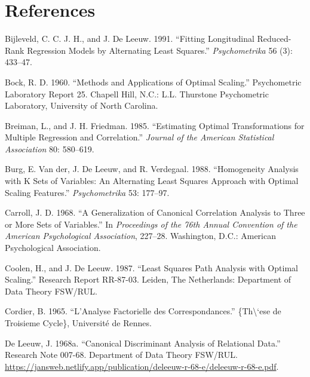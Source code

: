 \documentclass[
  12pt,
  letterpaper,
]{scrbook}
\newlength{\cslhangindent}
\newenvironment{CSLReferences}[2] %
 {\begin{list}{}{%
  \setlength{\itemindent}{0pt}
  \setlength{\leftmargin}{0pt}
  \setlength{\parsep}{0pt}
  \ifodd #1
   \setlength{\leftmargin}{\cslhangindent}
   \setlength{\itemindent}{-1\cslhangindent}
  \fi
  \setlength{\itemsep}{#2\baselineskip}}}
 {\end{list}}
\begin{document}

\chapter*{References}\label{references}


\label{refs}
\begin{CSLReferences}{1}{0}
Bijleveld, C. C. J. H., and J. De Leeuw. 1991. {``{Fitting Longitudinal
Reduced-Rank Regression Models by Alternating Least Squares}.''}
\emph{Psychometrika} 56 (3): 433--47.

Bock, R. D. 1960. {``{Methods and Applications of Optimal Scaling}.''}
Psychometric Laboratory Report 25. Chapell Hill, N.C.: L.L. Thurstone
Psychometric Laboratory, University of North Carolina.

Breiman, L., and J. H. Friedman. 1985. {``{Estimating Optimal
Transformations for Multiple Regression and Correlation}.''}
\emph{Journal of the American Statistical Association} 80: 580--619.

Burg, E. Van der, J. De Leeuw, and R. Verdegaal. 1988. {``Homogeneity
Analysis with {K} Sets of Variables: An Alternating Least Squares
Approach with Optimal Scaling Features.''} \emph{Psychometrika} 53:
177--97.

Carroll, J. D. 1968. {``{A Generalization of Canonical Correlation
Analysis to Three or More Sets of Variables}.''} In \emph{Proceedings of
the 76th Annual Convention of the American Psychological Association},
227--28. Washington, D.C.: American Psychological Association.

Coolen, H., and J. De Leeuw. 1987. {``{Least Squares Path Analysis with
Optimal Scaling}.''} Research Report RR-87-03. Leiden, The Netherlands:
Department of Data Theory FSW/RUL.

Cordier, B. 1965. {``{L'Analyse Factorielle des Correspondances}.''}
\{Th\textbackslash`ese de Troisieme Cycle\}, Université de Rennes.

De Leeuw, J. 1968a. {``Canonical Discriminant Analysis of Relational
Data.''} Research Note 007-68. Department of Data Theory FSW/RUL.
\url{https://jansweb.netlify.app/publication/deleeuw-r-68-e/deleeuw-r-68-e.pdf}.


\end{CSLReferences}
\end{document}
